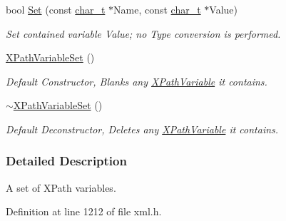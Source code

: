 \begin{DoxyCompactItemize}
bool \hyperlink{classphys_1_1xml_1_1XPathVariableSet_afa99a98b5c4e4790a921f67a153a9ff4}{Set} (const \hyperlink{namespacephys_1_1xml_afc87705cd1c2917d87b879715a2d8f6e}{char\_\-t} $\ast$Name, const \hyperlink{namespacephys_1_1xml_afc87705cd1c2917d87b879715a2d8f6e}{char\_\-t} $\ast$Value)
\begin{DoxyCompactList}\small\item\em Set contained variable Value; no Type conversion is performed. \item\end{DoxyCompactList}\item 
\hypertarget{classphys_1_1xml_1_1XPathVariableSet_a34733feeb7720d30c2a752f6f9cd6858}{
\hyperlink{classphys_1_1xml_1_1XPathVariableSet_a34733feeb7720d30c2a752f6f9cd6858}{XPathVariableSet} ()}
\label{classphys_1_1xml_1_1XPathVariableSet_a34733feeb7720d30c2a752f6f9cd6858}

\begin{DoxyCompactList}\small\item\em Default Constructor, Blanks any \hyperlink{classphys_1_1xml_1_1XPathVariable}{XPathVariable} it contains. \item\end{DoxyCompactList}\item 
\hypertarget{classphys_1_1xml_1_1XPathVariableSet_af9ac0b922e9399a30ee81a59eb44e464}{
\hyperlink{classphys_1_1xml_1_1XPathVariableSet_af9ac0b922e9399a30ee81a59eb44e464}{$\sim$XPathVariableSet} ()}
\label{classphys_1_1xml_1_1XPathVariableSet_af9ac0b922e9399a30ee81a59eb44e464}

\begin{DoxyCompactList}\small\item\em Default Deconstructor, Deletes any \hyperlink{classphys_1_1xml_1_1XPathVariable}{XPathVariable} it contains. \item\end{DoxyCompactList}\end{DoxyCompactItemize}


\subsubsection{Detailed Description}
A set of XPath variables. 

Definition at line 1212 of file xml.h.




